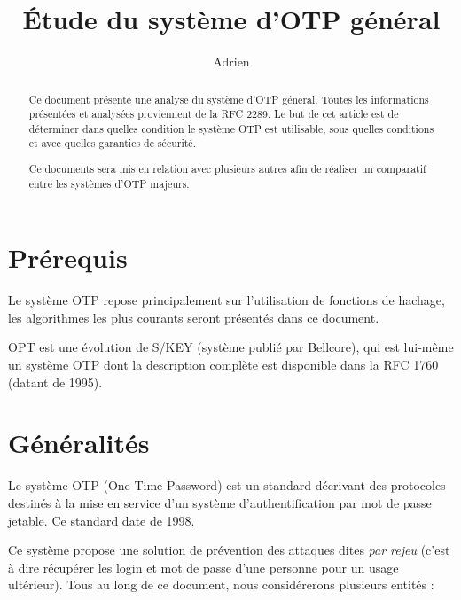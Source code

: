 \documentclass{../res/univ-projet}
\title{\'Etude du syst\`eme d'OTP g\'en\'eral}
\author{Adrien \bsc{Smondack}}
\begin{document}
\maketitle

\begin{abstract}
  Ce document présente une analyse du système d'OTP général. Toutes les 
informations présentées et analysées proviennent de la RFC 2289. Le but de cet 
article est de déterminer dans quelles condition le système OTP est utilisable, 
sous quelles conditions et avec quelles garanties de sécurité.
  
  Ce documents sera mis en relation avec plusieurs autres afin de réaliser un 
comparatif entre les systèmes d'OTP majeurs.
\end{abstract}
\newpage
\tableofcontents
\newpage

\section{Prérequis}
  Le système OTP repose principalement sur l'utilisation de fonctions de 
hachage, les algorithmes les plus courants seront présentés dans ce document.

  OPT est une évolution de S/KEY (système publié par Bellcore), qui est lui-même 
un système OTP dont la description complète est disponible dans la RFC 1760 
(datant de 1995).

\section{Généralités}
  Le système OTP (One-Time Password) est un standard décrivant des protocoles 
destinés à la mise en service d'un système d'authentification par mot de passe 
jetable. Ce standard date de 1998.

  Ce système propose une solution de prévention des attaques dites \emph{par 
rejeu} (c'est à dire récupérer les login et mot de passe d'une personne pour un 
usage ultérieur). Tous au long de ce document, nous considérerons plusieurs 
entités :
\end{document}

